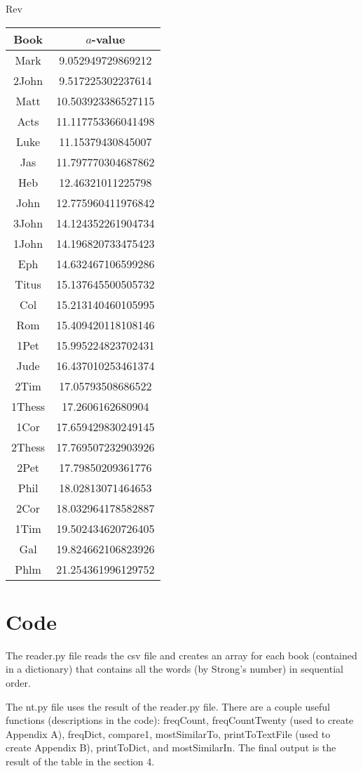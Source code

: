 \documentclass[12pt,letterpaper]{article}
\begin{document}
Rev
\begin{longtable}{|c|c|}
\hline
 Book & $a$-value \\ \hline
Mark & 9.052949729869212 \\ \hline
 2John & 9.517225302237614 \\ \hline
 Matt & 10.503923386527115 \\ \hline
 Acts & 11.117753366041498 \\ \hline
 Luke & 11.15379430845007 \\ \hline
 Jas & 11.797770304687862 \\ \hline
 Heb & 12.46321011225798 \\ \hline
 John & 12.775960411976842 \\ \hline
 3John & 14.124352261904734 \\ \hline
 1John & 14.196820733475423 \\ \hline
 Eph & 14.632467106599286 \\ \hline
 Titus & 15.137645500505732 \\ \hline
 Col & 15.213140460105995 \\ \hline
 Rom & 15.409420118108146 \\ \hline
 1Pet & 15.995224823702431 \\ \hline
 Jude & 16.437010253461374 \\ \hline
 2Tim & 17.05793508686522 \\ \hline
 1Thess & 17.2606162680904 \\ \hline
 1Cor & 17.659429830249145 \\ \hline
 2Thess & 17.769507232903926 \\ \hline
 2Pet & 17.79850209361776 \\ \hline
 Phil & 18.02813071464653 \\ \hline
 2Cor & 18.032964178582887 \\ \hline
 1Tim & 19.502434620726405 \\ \hline
 Gal & 19.824662106823926 \\ \hline
 Phlm & 21.254361996129752 \\ \hline 
\end{longtable}



\newpage
\section{Code}
The reader.py file reads the csv file and creates an array for each book (contained in a dictionary) that contains all the words (by Strong's number) in sequential order.


\newpage

The nt.py file uses the result of the reader.py file.  There are a couple useful functions (descriptions in the code): freqCount, freqCountTwenty (used to create Appendix A), freqDict, compare1, mostSimilarTo, printToTextFile (used to create Appendix B), printToDict, and mostSimilarIn.  The final output is the result of the table in the section 4. 

\end{document}
